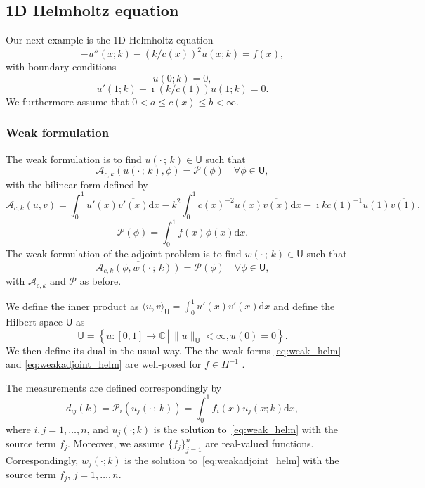 \documentclass[12pt]{amsart}
\newcommand{\rd}{\mathrm{d}}
\begin{document}
\subsection{1D Helmholtz equation} Our next example is the 1D Helmholtz equation
\[
-u''(x;k) - (k / c(x))^2 u(x;k) = f(x),
\]
with boundary conditions
\[
u(0;k) = 0,
\]
\[
u'(1;k) - \imath \left(k/c(1)\right) u(1;k) = 0.
\]
We furthermore assume that $0 < a \leq c(x) \leq b < \infty$.

\subsubsection{Weak formulation}
The weak formulation is to find $u(\cdot\,; \,  k) \in \mathsf{U}$ such that
\begin{equation}\label{eq:weak_helm}
\mathcal{A}_{c,k}(u(\cdot\,;\, k), \phi) = \mathcal{P}(\phi)\quad \forall \phi \in \mathsf{U},
\end{equation}
with the bilinear form defined by
\[
\mathcal{A}_{c,k}(u,v) = \int_0^1 u'(x) \overline{v'(x)}\mathrm{d}x - k^2 \int_0^1 c(x)^{-2}u(x) \overline{v(x)}\mathrm{d}x -\imath k c(1)^{-1}u(1)\overline{v(1)},
\]
\[
\mathcal{P}(\phi) = \int_0^1 f(x)\overline{\phi(x)}\mathrm{d}x.
\]
The weak formulation of the adjoint problem is to find $w(\cdot \,;\, k) \in \mathsf{U}$ such that
\begin{equation}\label{eq:weakadjoint_helm}
\overline{\mathcal{A}_{c,k}(\phi, w(\cdot \,;\, k))} = \mathcal{P}(\phi)\quad \forall \phi \in \mathsf{U},
\end{equation}
with $\mathcal{A}_{c,k}$ and $\mathcal{P}$ as before. 

We define the inner product as $\langle u, v \rangle_\mathsf{U} = \int_0^1 u'(x)\overline{v'(x)}\mathrm{d}x$ and define the Hilbert space $\mathsf{U}$  as
\[
\mathsf{U} = \left\{ u : [0,1]\rightarrow\mathbb{C} \, \left|\, \|u\|_{\mathsf{U}} < \infty, u(0) = 0\right.\right\}.
\]
We then define its dual in the usual way. The the weak forms \eqref{eq:weak_helm} and \eqref{eq:weakadjoint_helm} are well-posed for $f \in H^{-1}$ \cite{Ihlenburg1997}.

The measurements are defined correspondingly by 
\[
d_{ij}(k) = \mathcal{P}_i(u_j(\cdot \,;\, k)) = \int_0^1 f_i(x) \overline{u_j(x;k)}  \rd x,
\]
where $i,j = 1,\ldots,n$, and $u_j(\cdot;k)$ is the solution to~\eqref{eq:weak_helm} with the source term $f_j$. Moreover, we assume $\{f_j\}_{j=1}^n$ are real-valued functions. Correspondingly, $w_j(\cdot;k)$ is the solution to~\eqref{eq:weakadjoint_helm} with the source term $f_j$, $j=1,\ldots,n$.
\end{document}

